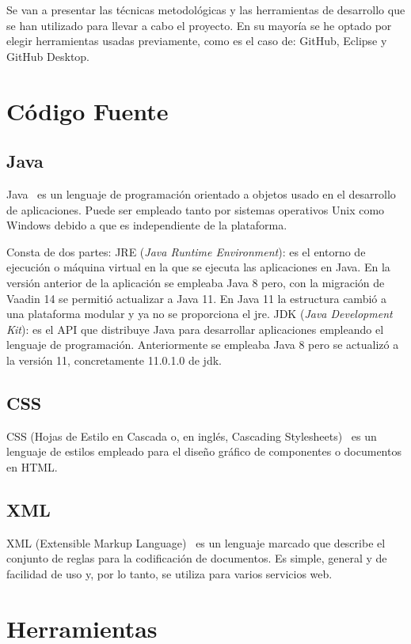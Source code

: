 
Se van a presentar las técnicas metodológicas y las herramientas de desarrollo que se han utilizado para llevar a cabo el proyecto. En su mayoría se he optado por elegir herramientas usadas previamente, como es el caso de: GitHub, Eclipse y GitHub Desktop.

\section{Código Fuente}

\subsection{Java}
Java~\cite{pagina_java} es un lenguaje de programación orientado a objetos usado en el desarrollo de aplicaciones. Puede ser empleado tanto por sistemas operativos Unix como Windows debido a que es independiente de la plataforma.

Consta de dos partes: 
JRE (\emph{Java Runtime Environment}): es el entorno de ejecución o máquina virtual en la que se ejecuta las aplicaciones en Java. En la versión anterior de la aplicación se empleaba Java 8 pero, con la migración de Vaadin 14 se permitió actualizar a Java 11. En Java 11 la estructura cambió a una plataforma modular y ya no se proporciona el jre. 
JDK (\emph{Java Development Kit}): es el API que distribuye Java para desarrollar aplicaciones empleando el lenguaje de programación. Anteriormente se empleaba Java 8 pero se actualizó a la versión 11, concretamente 11.0.1.0 de jdk. 

\subsection{CSS}
CSS (Hojas de Estilo en Cascada o, en inglés, Cascading Stylesheets)~\cite{pagina_css} es un lenguaje de estilos empleado para el diseño gráfico de componentes o documentos en HTML.

\subsection{XML}
XML (Extensible Markup Language)~\cite{pagina_xml} es un lenguaje marcado que describe el conjunto de reglas para la codificación de documentos. Es simple, general y de facilidad de uso y, por lo tanto, se utiliza para varios servicios web.

\section{Herramientas}
